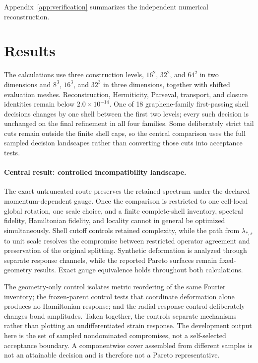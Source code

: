 \documentclass[11pt]{article}
\begin{document}
Appendix~\ref{app:verification} summarizes the independent numerical reconstruction.

\section{Results}

The calculations use three construction levels, $16^2$, $32^2$, and $64^2$ in two
dimensions and $8^3$, $16^3$, and $32^3$ in three dimensions, together with shifted
evaluation meshes. Reconstruction, Hermiticity, Parseval, transport, and closure
identities remain below $2.0\times10^{-14}$. One of 18 graphene-family first-passing
shell decisions changes by one shell between the first two levels; every such decision
is unchanged on the final refinement in all four families. Some deliberately strict
tail cuts remain outside the finite shell caps, so the central comparison uses the full
sampled decision landscapes rather than converting those cuts into acceptance tests.

\paragraph{Central result: controlled incompatibility landscape.}
The exact untruncated route preserves the retained spectrum under the declared
momentum-dependent gauge. Once the comparison is restricted to one cell-local global
rotation, one scale choice, and a finite complete-shell inventory, spectral fidelity,
Hamiltonian fidelity, and locality cannot in general be optimized simultaneously.
Shell cutoff controls retained complexity, while the path from $\lambda_{*,s}$ to unit
scale resolves the compromise between restricted operator agreement and preservation of
the original splitting. Synthetic deformation is analyzed through separate response
channels, while the reported Pareto surfaces remain fixed-geometry results. Exact gauge
equivalence holds throughout both calculations.

The geometry-only control isolates metric reordering of the same Fourier inventory; the
frozen-parent control tests that coordinate deformation alone produces no Hamiltonian
response; and the radial-response control deliberately changes bond amplitudes. Taken
together, the controls separate mechanisms rather than plotting an undifferentiated
strain response. The development output here is the set of sampled nondominated
compromises, not a self-selected acceptance boundary. A componentwise cover assembled
from different samples is not an attainable decision and is therefore not a Pareto
representative.
\end{document}
